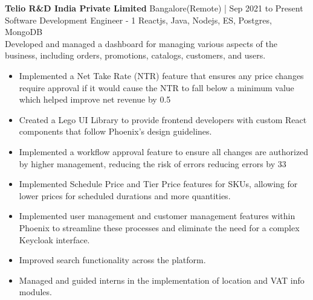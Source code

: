 \documentclass[11pt]{article}
\newcommand{\job}[4]{
    \begingroup
        \textbf{\small#1}
        \hfill\color{black!70}\small{#3}
        \\
        \small#2
        \hfill\color{black!70}\small{#4}
    \endgroup
}
\begin{document}
\begin{paracol}{2}
{      \job{Telio R\&D India Private Limited}{Software Development Engineer - 1}{Bangalore(Remote) | Sep 2021 to Present}{Reactjs, Java, Nodejs, ES, Postgres, MongoDB}{}\\
      \textrm{Developed and managed a dashboard for managing various aspects of the business, including orders, promotions, catalogs, customers, and users.}
      \begin{itemize}
        \item Implemented a Net Take Rate (NTR) feature that ensures any price changes require approval if it would cause the NTR to fall below a minimum value which helped improve net revenue by 0.5%
        \item Created a Lego UI Library to provide frontend developers with custom React components that follow Phoenix's design guidelines.
        \item Implemented a workflow approval feature to ensure all changes are authorized by higher management, reducing the risk of errors
reducing errors by 33%
        \item Implemented Schedule Price and Tier Price features for SKUs, allowing for lower prices for scheduled durations and more quantities.
        \item Implemented user management and customer management features within Phoenix to streamline these processes and eliminate the need for a complex Keycloak interface.
        \item Improved search functionality across the platform.
        \item Managed and guided interns in the implementation of location and VAT info modules.
      \end{itemize}
      \vspace{4mm}

}
\end{paracol}
\end{document}
